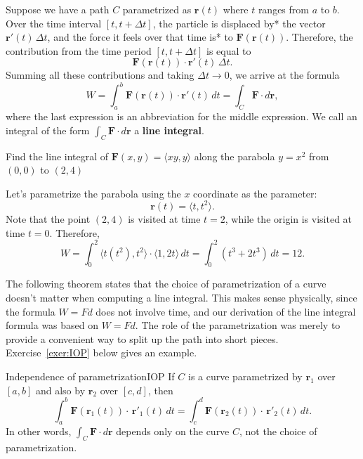 \documentclass[svgnames]{report}
\begin{document}
Suppose we have a path $C$ parametrized as $\mathbf{r}(t)$ where $t$
ranges from $a$ to $b$. Over the time interval $[t,t+\Delta t]$, the
particle is displaced by* the vector $\mathbf{r}'(t) \, \Delta t$, and
the force it feels over that time is* to $\mathbf{F}(\mathbf{r}(t))$.
Therefore, the contribution from the time period $[t, t+\Delta t]$ is
equal to 
\[
  \mathbf{F}(\mathbf{r}(t)) \cdot \mathbf{r}'(t) \, \Delta t. 
\]
Summing all these contributions and taking $\Delta t \to 0$, we arrive
at the formula
\[
  W = \int_a^b \mathbf{F}(\mathbf{r}(t)) \cdot \mathbf{r}'(t) \, dt =
  \int_C \mathbf{F} \cdot d\mathbf{r}, 
\]
where the last expression is an abbreviation for the middle
expression. We call an integral of the form $\int_C \mathbf{F} \cdot
d\mathbf{r}$ a \textbf{line integral}. 

\begin{example}{}{}
  Find the line integral of $\mathbf{F}(x,y) = \langle xy, y \rangle$
  along the parabola $y = x^2$ from 
  $(0,0)$ to $(2,4)$
\end{example}

\begin{solution}
  Let's parametrize the parabola using the $x$ coordinate as the
  parameter:
  \[
    \mathbf{r}(t) = \langle t, t^2 \rangle. 
  \]
  Note that the point $(2,4)$ is visited at time $t=2$, while the
  origin is visited at time $t=0$. Therefore, 
  \[
    W = \int_0^2 \langle t(t^2), t^2 \rangle \cdot \langle 1, 2t \rangle
    \, dt = \int_0^2 (t^3 + 2t^3) \, dt = \boxed{12}. 
  \]
\end{solution}

The following theorem states that the choice of parametrization of a
curve doesn't matter when computing a line integral. This makes sense
physically, since the formula $W = Fd$ does not involve time, and our
derivation of the line integral formula was based on $W=Fd$. The role
of the parametrization was merely to provide a convenient way to split
up the path into short pieces. Exercise~\ref{exer:IOP} below gives an
example.

\begin{theo}{Independence of parametrization}{IOP}
  If $C$ is a curve parametrized by $\mathbf{r}_1$ over $[a,b]$ and
  also by $\mathbf{r}_2$ over $[c,d]$, then
  \[
    \int_a^b\mathbf{F}(\mathbf{r}_1(t))  \cdot \,
    \mathbf{r}'_1(t) \, dt =
    \int_c^d \mathbf{F}(\mathbf{r}_2(t))  \cdot \,
    \mathbf{r}'_2(t) \, dt. 
  \]
  In other words, $\int_C \mathbf{F} \cdot d\mathbf{r}$ depends only
  on the curve $C$, not the choice of parametrization. 
\end{theo}
\end{document}
